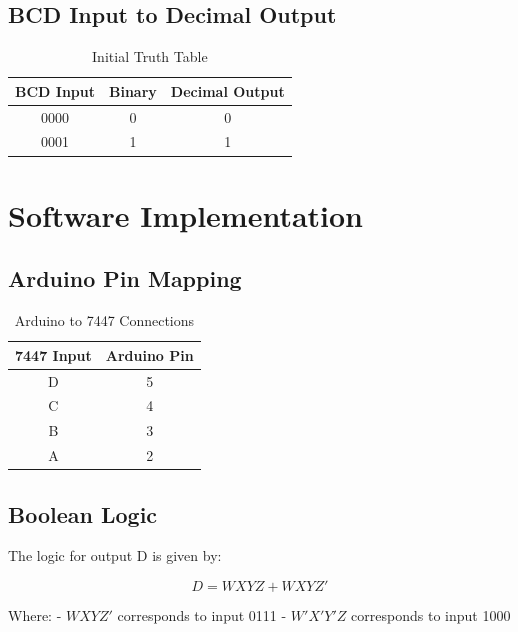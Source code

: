 \documentclass[12pt]{article}
\begin{document}
\subsection{BCD Input to Decimal Output}
\begin{table}[h!]
\centering
\begin{tabular}{|c|c|c|}
\hline
\textbf{BCD Input} & \textbf{Binary} & \textbf{Decimal Output} \\
\hline
0000 & 0 & 0 \\
0001 & 1 & 1 \\
\hline
\end{tabular}
\caption{Initial Truth Table}
\end{table}

\section{Software Implementation}
\subsection{Arduino Pin Mapping}
\begin{table}[h!]
\centering
\begin{tabular}{|c|c|}
\hline
\textbf{7447 Input} & \textbf{Arduino Pin} \\
\hline
D & 5 \\
C & 4 \\
B & 3 \\
A & 2 \\
\hline
\end{tabular}
\caption{Arduino to 7447 Connections}
\end{table}

\subsection{Boolean Logic}
The logic for output D is given by:


\[
D = WXYZ + WXYZ'
\]



Where:
- \( WXYZ' \) corresponds to input 0111
- \( W'X'Y'Z \) corresponds to input 1000
\end{document}
